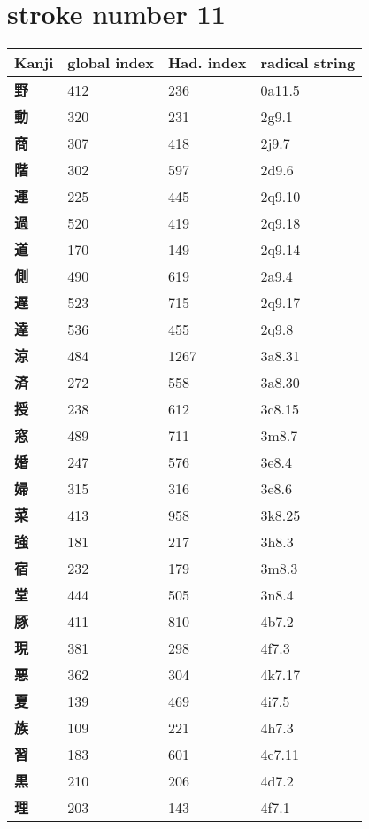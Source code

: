 \section{stroke number 11}
  \begin{longtable}[c]{llll}
    \bfseries Kanji & \bfseries global index & \bfseries Had. index & \bfseries radical string\\\hline\endhead
    \bfseries 野 & 412 & 236 & 0a11.5\\
    \bfseries 動 & 320 & 231 & 2g9.1\\
    \bfseries 商 & 307 & 418 & 2j9.7\\
    \bfseries 階 & 302 & 597 & 2d9.6\\
    \bfseries 運 & 225 & 445 & 2q9.10\\
    \bfseries 過 & 520 & 419 & 2q9.18\\
    \bfseries 道 & 170 & 149 & 2q9.14\\
    \bfseries 側 & 490 & 619 & 2a9.4\\
    \bfseries 遅 & 523 & 715 & 2q9.17\\
    \bfseries 達 & 536 & 455 & 2q9.8\\
    \bfseries 涼 & 484 & 1267 & 3a8.31\\
    \bfseries 済 & 272 & 558 & 3a8.30\\
    \bfseries 授 & 238 & 612 & 3c8.15\\
    \bfseries 窓 & 489 & 711 & 3m8.7\\
    \bfseries 婚 & 247 & 576 & 3e8.4\\
    \bfseries 婦 & 315 & 316 & 3e8.6\\
    \bfseries 菜 & 413 & 958 & 3k8.25\\
    \bfseries 強 & 181 & 217 & 3h8.3\\
    \bfseries 宿 & 232 & 179 & 3m8.3\\
    \bfseries 堂 & 444 & 505 & 3n8.4\\
    \bfseries 豚 & 411 & 810 & 4b7.2\\
    \bfseries 現 & 381 & 298 & 4f7.3\\
    \bfseries 悪 & 362 & 304 & 4k7.17\\
    \bfseries 夏 & 139 & 469 & 4i7.5\\
    \bfseries 族 & 109 & 221 & 4h7.3\\
    \bfseries 習 & 183 & 601 & 4c7.11\\
    \bfseries 黒 & 210 & 206 & 4d7.2\\
    \bfseries 理 & 203 & 143 & 4f7.1\\

\end{longtable}
